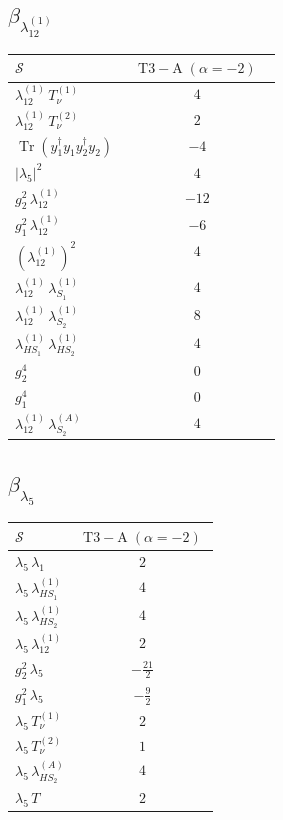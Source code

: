 \documentclass[9pt]{article}
\begin{document}
\subsection*{$ \beta_{\lambda_{12}^{(1)}} $}
\begin{longtable}{@{}p{0.31\linewidth}c@{}}
\toprule
$\mathcal{S}$ & $ \mathrm{T3-A}\;(\alpha=-2) $ \\
\midrule
$ \lambda_{12}^{(1)}\,T_{\nu}^{(1)} $ & $ 4 $ \\
$ \lambda_{12}^{(1)}\,T_{\nu}^{(2)} $ & $ 2 $ \\
$ \operatorname{Tr}(y_1^\dagger y_1y_2^\dagger y_2) $ & $ -4 $ \\
$ |\lambda_5|^2 $ & $ 4 $ \\
$ g_2^2\,\lambda_{12}^{(1)} $ & $ -12 $ \\
$ g_1^2\,\lambda_{12}^{(1)} $ & $ -6 $ \\
$ \left(\lambda_{12}^{(1)}\right)^2 $ & $ 4 $ \\
$ \lambda_{12}^{(1)}\,\lambda_{S_1}^{(1)} $ & $ 4 $ \\
$ \lambda_{12}^{(1)}\,\lambda_{S_2}^{(1)} $ & $ 8 $ \\
$ \lambda_{HS_1}^{(1)}\,\lambda_{HS_2}^{(1)} $ & $ 4 $ \\
$ g_2^4 $ & $ 0 $ \\
$ g_1^4 $ & $ 0 $ \\
$ \lambda_{12}^{(1)}\,\lambda_{S_2}^{(A)} $ & $ 4 $ \\
\bottomrule
\end{longtable}
\subsection*{$ \beta_{\lambda_5} $}
\begin{longtable}{@{}p{0.31\linewidth}c@{}}
\toprule
$\mathcal{S}$ & $ \mathrm{T3-A}\;(\alpha=-2) $ \\
\midrule
$ \lambda_5\,\lambda_1 $ & $ 2 $ \\
$ \lambda_5\,\lambda_{HS_1}^{(1)} $ & $ 4 $ \\
$ \lambda_5\,\lambda_{HS_2}^{(1)} $ & $ 4 $ \\
$ \lambda_5\,\lambda_{12}^{(1)} $ & $ 2 $ \\
$ g_2^2\,\lambda_5 $ & $ - \frac{21}{2} $ \\
$ g_1^2\,\lambda_5 $ & $ - \frac{9}{2} $ \\
$ \lambda_5\,T_{\nu}^{(1)} $ & $ 2 $ \\
$ \lambda_5\,T_{\nu}^{(2)} $ & $ 1 $ \\
$ \lambda_5\,\lambda_{HS_2}^{(A)} $ & $ 4 $ \\
$ \lambda_5\,T $ & $ 2 $ \\
\bottomrule
\end{longtable}
\end{document}
